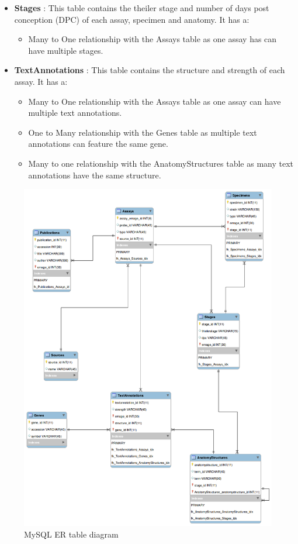 \begin{itemize}
\item \textbf{Stages} : This table contains the theiler stage and number of days post conception (DPC) of each assay, specimen and anatomy. It has a:
\begin{itemize}
\item Many to One relationship with the Assays table as one assay has can have multiple stages.
\end{itemize} 

\item \textbf{TextAnnotations} : This table contains the structure and strength of each assay. It has a:
\begin{itemize}
\item Many to One relationship with the Assays table as one assay can have multiple text annotations.
\item One to Many relationship with the Genes table as multiple text annotations can feature the same gene.
\item Many to one relationship with the AnatomyStructures table as many text annotations have the same structure.
\end{itemize} 

\end{itemize}

\newpage
\begin{figure}[H]\begin{center}\includegraphics[width=1\linewidth]{images/emage_erd}\caption{MySQL ER table diagram}\label{fig:mysql}\end{center}\end{figure}

